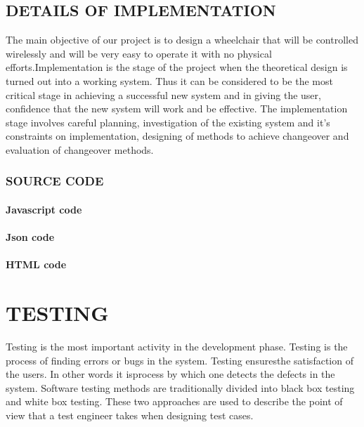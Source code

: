 \documentclass[11pt]{report} %
\begin{document}
\section{DETAILS OF IMPLEMENTATION}
\label{sec:DETAILS OF IMPLEMENTATION}

The main objective of our project is to design a wheelchair that will be controlled wirelessly and will be very easy to operate it with no physical efforts.Implementation is the stage of the project when the theoretical design is turned out into a working system. Thus it can be considered to be the most critical stage in achieving a successful new system and in giving the user, confidence that the new system will work and be effective.
The implementation stage involves careful planning, investigation of the existing system and it's constraints on implementation, designing of methods to achieve changeover and evaluation of changeover methods.

\subsection{SOURCE CODE}
\label{subsec:SOURCE CODE}
\subsubsection{Javascript code}
\label{subsubsec:Javascript code}

\subsubsection{Json code}
\label{subsubsec:Json code}

\subsubsection{HTML code}
\label{subsubsec:HTML code}



\chapter{TESTING}
\label{cha:TESTING}

Testing is the most important activity in the development phase. Testing is the process of    finding   errors or bugs in the system. Testing ensuresthe satisfaction of the users. In other words it isprocess by which one detects the defects in the system. Software testing methods are  traditionally divided into black box testing and white box testing. These two approaches are used to describe the point of view that a test engineer takes when designing test cases.
\end{document}
